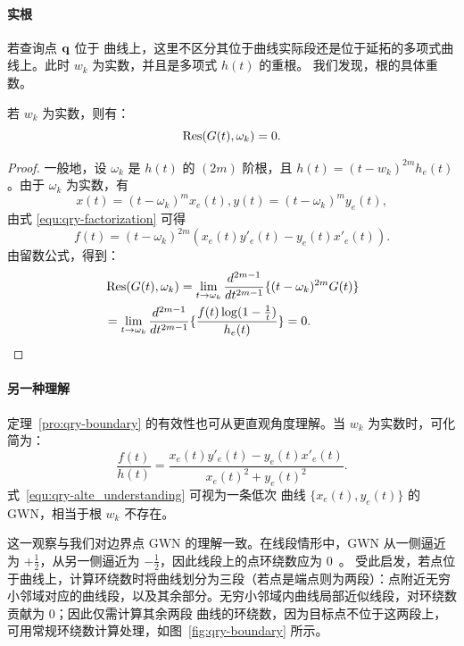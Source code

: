 \paragraph{实根}
若查询点 $\mathbf{q}$ 位于 \Bezier 曲线上，这里不区分其位于曲线实际段还是位于延拓的多项式曲线上。此时 \(w_k\) 为实数，并且是多项式 \(h(t)\) 的重根。
我们发现，根的具体重数。
\begin{theorem}\label{pro:qry-boundary}
若 \(w_k\) 为实数，则有：
\[\mathop{\mathrm{Res}}(G(t),\omega_k)=0.\]
\end{theorem}
\begin{proof}
一般地，设 \(\omega_k\) 是 \(h(t)\) 的 \((2m)\) 阶根，且 $h(t)=(t-w_k)^{2m}h_e(t)$。由于 \(\omega_k\) 为实数，有
\begin{equation}\label{equ:qry-factorization}
    x(t)=(t-\omega_k)^m x_e(t),y(t)=(t-\omega_k)^m y_e(t),
\end{equation}
由式 \eqref{equ:qry-factorization} 可得
 \begin{equation}
      f(t) = (t-\omega_k)^{2m} (x_e(t)y'_e(t)-y_e(t) x'_e(t)).
 \end{equation}
 由留数公式，得到：
\begin{equation}
\begin{aligned}
    &\mathop{\mathrm{Res}}(G(t),\omega_k)=\lim_{t\to \omega_k}\frac{d^{2m-1}}{dt^{2m-1}}\{(t-\omega_k)^{2m} G(t)\} \\
    &=\lim_{t\to \omega_k}\frac{d^{2m-1}}{dt^{2m-1}}\{\frac{f(t)\log(1-\frac{1}{t})}{h_e(t)}\} =0.
 \end{aligned}
\end{equation}
\end{proof}


\paragraph{另一种理解}
定理~\ref{pro:qry-boundary} 的有效性也可从更直观角度理解。当 \(w_k\) 为实数时，可化简为：
\begin{equation}\label{equ:qry-alte_understanding}
    \frac{f(t)}{h(t)}=\frac{x_e(t)y'_e(t)-y_e(t)x'_e(t)}{x_e(t)^2+y_e(t)^2}.
\end{equation}
式~\eqref{equ:qry-alte_understanding} 可视为一条低次 \Bezier 曲线 $\{x_e(t),y_e(t)\}$ 的 GWN，相当于根 \(w_k\) 不存在。

这一观察与我们对边界点 GWN 的理解一致。在线段情形中，GWN 从一侧逼近为 \(+\tfrac{1}{2}\)，从另一侧逼近为 \(-\tfrac{1}{2}\)，因此线段上的点环绕数应为 0~\cite{Jacobson2013RobustIS}。
受此启发，若点位于曲线上，计算环绕数时将曲线划分为三段（若点是端点则为两段）：点附近无穷小邻域对应的曲线段，以及其余部分。无穷小邻域内曲线局部近似线段，对环绕数贡献为 0；因此仅需计算其余两段 \Bezier 曲线的环绕数，因为目标点不位于这两段上，可用常规环绕数计算处理，如图~\ref{fig:qry-boundary} 所示。

